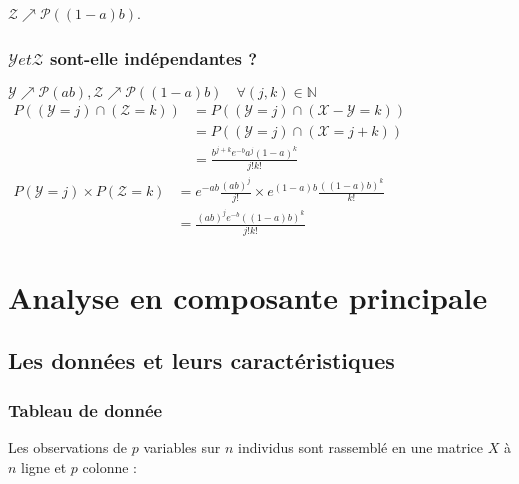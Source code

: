 \documentclass[a4paper, 12pt]{article}
\begin{document}
$\mathcal{Z} \nearrow \mathcal{P} ((1 - a)b)$.


\subsubsection{$\mathcal{Y} et \mathcal{Z}$ sont-elle indépendantes ?}
$\mathcal{Y} \nearrow \mathcal{P} (ab), \mathcal{Z} \nearrow \mathcal{P} ((1 - a)b) \quad \forall (j, k) \in \mathbb{N}$ \\

$
\begin{aligned}
P((\mathcal{Y} = j) \cap (\mathcal{Z} = k)) &= P((\mathcal{Y} = j) \cap (\mathcal{X} - \mathcal{Y} = k)) \\
&= P((\mathcal{Y} = j) \cap (\mathcal{X} = j + k)) \\
&= \frac{b^{j + k} e^{-b} a^j (1 - a)^k}{j! k!}
\end{aligned}
$ \\

$
\begin{aligned}
P(\mathcal{Y} = j) \times P(\mathcal{Z} = k) &= e^{-ab} \frac{(ab)^j}{j!} \times e^{(1 - a)b} \frac{((1 - a)b)^k}{k!} \\
&= \frac{(ab)^j e^{-b} ((1 - a)b)^k}{j! k!}
\end{aligned}
$ \\


\section{Analyse en composante principale}
\subsection{Les données et leurs caractéristiques}
\subsubsection{Tableau de donnée}
Les observations de $p$ variables sur $n$ individus sont rassemblé en une matrice $X$ à $n$ ligne et $p$ colonne : \\
\end{document}

